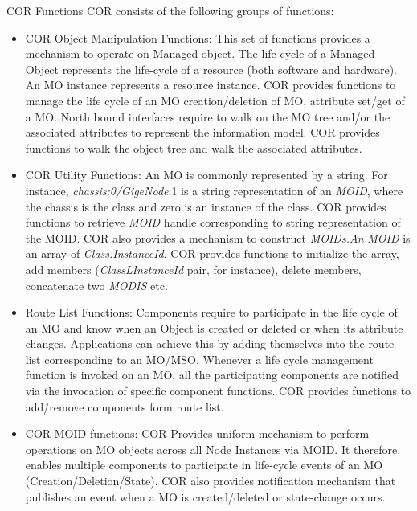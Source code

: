 \begin{Desc}
\item[COR Functions]COR consists of the following groups of functions: \begin{itemize}
\item COR Object Manipulation Functions: This set of functions provides a mechanism to operate on Managed object. The life-cycle of a Managed Object represents the life-cycle of a resource (both software and hardware). An MO instance represents a resource instance. COR provides functions to manage the life cycle of an MO creation/deletion of MO, attribute set/get of a MO. North bound interfaces require to walk on the MO tree and/or the associated attributes to represent the information model. COR provides functions to walk the object tree and walk the associated attributes.\end{itemize}
\begin{itemize}
\item COR Utility Functions: An MO is commonly represented by a string. For instance, {\em chassis:0/Gige\-Node\/}:1 is a string representation of an {\em MOID\/}, where the chassis is the class and zero is an instance of the class. COR provides functions to retrieve {\em MOID\/} handle corresponding to string representation of the MOID. COR also provides a mechanism to construct {\em MOIDs.An\/} {\em MOID\/} is an array of {\em Class:Instance\-Id\/}. COR provides functions to initialize the array, add members ({\em Class\-LInstance\-Id\/} pair, for instance), delete members, concatenate two {\em MODIS\/} etc.\end{itemize}
\begin{itemize}
\item Route List Functions: Components require to participate in the life cycle of an MO and know when an Object is created or deleted or when its attribute changes. Applications can achieve this by adding themselves into the route-list corresponding to an MO/MSO. Whenever a life cycle management function is invoked on an MO, all the participating components are notified via the invocation of specific component functions. COR provides functions to add/remove components form route list. \item COR MOID functions: COR Provides uniform mechanism to perform operations on MO objects across all Node Instances via MOID. It therefore, enables multiple components to participate in life-cycle events of an MO (Creation/Deletion/State). COR also provides notification mechanism that publishes an event when a MO is created/deleted or state-change occurs.\end{itemize}

\end{Desc}
